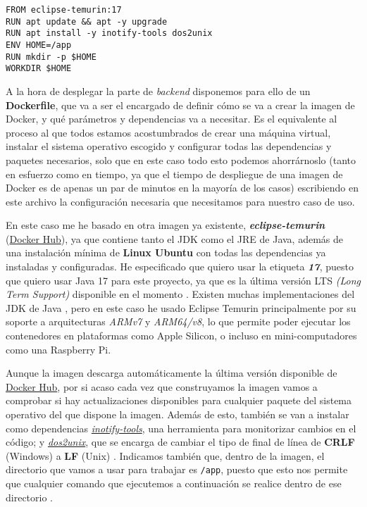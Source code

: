 \begin{lstlisting}
FROM eclipse-temurin:17
RUN apt update && apt -y upgrade
RUN apt install -y inotify-tools dos2unix
ENV HOME=/app
RUN mkdir -p $HOME
WORKDIR $HOME
\end{lstlisting}

A la hora de desplegar la parte de \textit{backend} disponemos para ello de un \textbf{Dockerfile}, que va a ser el encargado de definir cómo se va a crear la imagen de Docker, y qué parámetros y dependencias va a necesitar. Es el equivalente al proceso al que todos estamos acostumbrados de crear una máquina virtual, instalar el sistema operativo escogido y configurar todas las dependencias y paquetes necesarios, solo que en este caso todo esto podemos ahorrárnoslo (tanto en esfuerzo como en tiempo, ya que el tiempo de despliegue de una imagen de Docker es de apenas un par de minutos en la mayoría de los casos) escribiendo en este archivo la configuración necesaria que necesitamos para nuestro caso de uso.

En este caso me he basado en otra imagen ya existente, \textit{\textbf{eclipse-temurin}} (\href{https://hub.docker.com/layers/library/eclipse-temurin/17/images/sha256-b0faf02bf7acfc65be1c2d0a291140300bd129620f145bf1013a1da748295d0c?context=explore}{Docker Hub}), ya que contiene tanto el JDK como el JRE de Java, además de una instalación mínima de \textbf{Linux Ubuntu} con todas las dependencias ya instaladas y configuradas. He especificado que quiero usar la etiqueta \textit{\textbf{17}}, puesto que quiero usar Java 17 para este proyecto, ya que es la última versión LTS \textit{(Long Term Support)} disponible en el momento \cite{java:releases}. Existen muchas implementaciones del JDK de Java \cite{foojay:java-jdks}, pero en este caso he usado Eclipse Temurin principalmente por su soporte a arquitecturas \textit{ARMv7} y \textit{ARM64/v8}, lo que permite poder ejecutar los contenedores en plataformas como Apple Silicon, o incluso en mini-computadores como una Raspberry Pi.

Aunque la imagen descarga automáticamente la última versión disponible de \href{https://hub.docker.com/layers/library/eclipse-temurin/17/images/sha256-b0faf02bf7acfc65be1c2d0a291140300bd129620f145bf1013a1da748295d0c?context=explore}{Docker Hub}, por si acaso cada vez que construyamos la imagen vamos a comprobar si hay actualizaciones disponibles para cualquier paquete del sistema operativo del que dispone la imagen. Además de esto, también se van a instalar como dependencias \textit{\href{https://github.com/inotify-tools}{inotify-tools}}, una herramienta para monitorizar cambios en el código; y \textit{\href{https://dos2unix.sourceforge.io/}{dos2unix}}, que se encarga de cambiar el tipo de final de línea de \textbf{CRLF} (Windows) a \textbf{LF} (Unix) \cite{medium:spring-boot-in-docker}. Indicamos también que, dentro de la imagen, el directorio que vamos a usar para trabajar es \verb,/app,, puesto que esto nos permite que cualquier comando que ejecutemos a continuación se realice dentro de ese directorio \cite{docker:workdir}.

